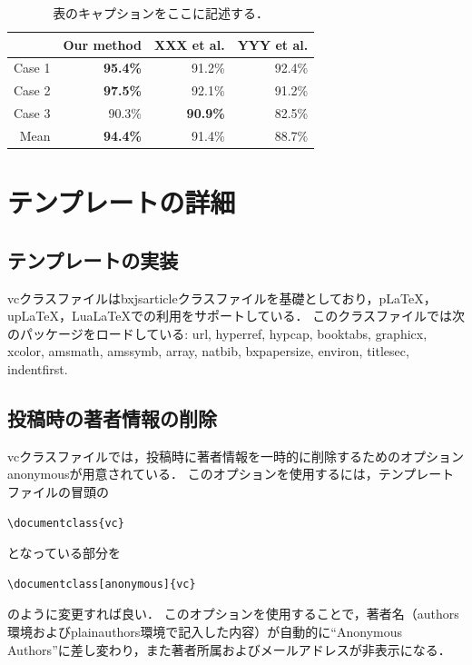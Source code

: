\documentclass[anonymous]{vc}
\begin{document}
\begin{table}
  \centering
  \caption{表のキャプションをここに記述する．}
  \label{tab:accuracy}
  \begin{tabular}{@{}rrrr@{}}
    \toprule
    & Our method & XXX et al. & YYY et al. \\
    \midrule
    Case 1 & \textbf{95.4\%} &         91.2\%  & 92.4\% \\
    Case 2 & \textbf{97.5\%} &         92.1\%  & 91.2\% \\
    Case 3 &         90.3\%  & \textbf{90.9\%} & 82.5\% \\
    \midrule
    Mean   & \textbf{94.4\%} &         91.4\%  & 88.7\% \\
    \bottomrule
  \end{tabular}
\end{table}

\section{テンプレートの詳細}

\subsection{テンプレートの実装}

\textsf{vc}クラスファイルは\textsf{bxjsarticle}クラスファイルを基礎としており，pLaTeX，upLaTeX，LuaLaTeXでの利用をサポートしている．
このクラスファイルでは次のパッケージをロードしている:
\textsf{url},
\textsf{hyperref},
\textsf{hypcap},
\textsf{booktabs},
\textsf{graphicx},
\textsf{xcolor},
\textsf{amsmath},
\textsf{amssymb},
\textsf{array},
\textsf{natbib},
\textsf{bxpapersize},
\textsf{environ},
\textsf{titlesec},
\textsf{indentfirst}.

\subsection{投稿時の著者情報の削除}

\textsf{vc}クラスファイルでは，投稿時に著者情報を一時的に削除するためのオプション\textsf{anonymous}が用意されている．
このオプションを使用するには，テンプレートファイルの冒頭の
\begin{verbatim}
\documentclass{vc}
\end{verbatim}
となっている部分を
\begin{verbatim}
\documentclass[anonymous]{vc}
\end{verbatim}
のように変更すれば良い．
このオプションを使用することで，著者名（\textsf{authors}環境および\textsf{plainauthors}環境で記入した内容）が自動的に``Anonymous Authors''に差し変わり，また著者所属およびメールアドレスが非表示になる．
\end{document}
